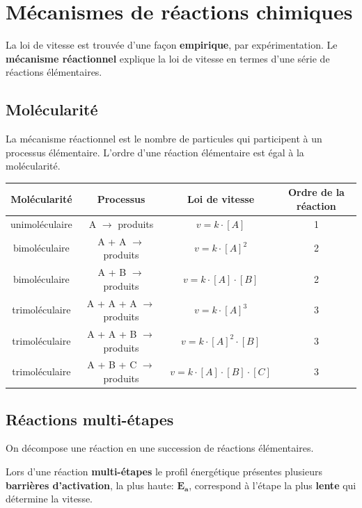 \documentclass[10pt,a4paper]{book}
\begin{document}
\section{Mécanismes de réactions chimiques}

La loi de vitesse est trouvée d'une façon \textbf{empirique}, par expérimentation.
Le \textbf{mécanisme réactionnel} explique la loi de vitesse en termes d'une série de réactions élémentaires.

\subsection{Molécularité}

La mécanisme réactionnel  est le nombre de particules qui participent à un processus élémentaire. L'ordre d'une réaction élémentaire est égal à la molécularité.

\begin{center}
\begin{tabular}{| c | c | c | c |}
\hline
\textbf{Molécularité} & \textbf{Processus} & \textbf{Loi de vitesse} & \textbf{Ordre de la réaction} \\
\hline
unimoléculaire & A $\rightarrow$ produits & $v = k\cdot [A]$ & 1 \\
\hline
bimoléculaire & A + A $\rightarrow$ produits & $v = k\cdot [A]^2$ & 2 \\
\hline
bimoléculaire & A + B $\rightarrow$ produits & $v = k\cdot [A]\cdot [B]$ & 2 \\
\hline
trimoléculaire & A + A + A $\rightarrow$ produits & $v = k\cdot [A]^3$ & 3 \\
\hline
trimoléculaire & A + A + B $\rightarrow$ produits & $v = k\cdot [A]^2\cdot [B]$ & 3 \\
\hline
trimoléculaire & A + B + C $\rightarrow$ produits & $v = k\cdot [A]\cdot [B]\cdot [C]$ & 3 \\
\hline
\end{tabular}
\end{center}

\subsection{Réactions multi-étapes}

On décompose une réaction en une succession de réactions élémentaires. \par
Lors d'une réaction \textbf{multi-étapes} le profil énergétique présentes plusieurs \textbf{barrières d'activation}, la plus haute: $\mathbf{E_a}$, correspond à l'étape la plus \textbf{lente} qui détermine la vitesse.
\end{document}
